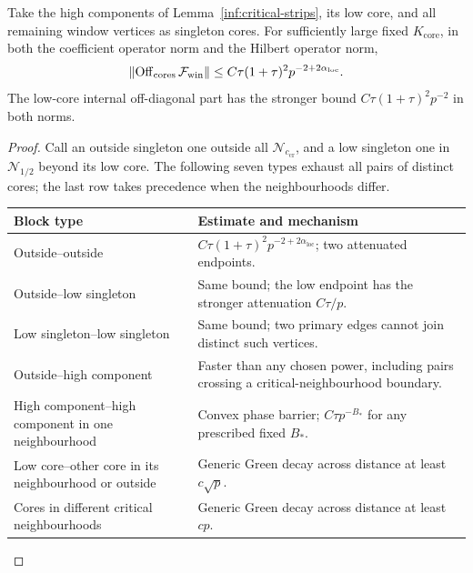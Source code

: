\begin{lemma}\label{inf:off-core-table}
Take the high components of Lemma~\ref{inf:critical-strips}, its
low core, and all remaining window vertices as singleton cores.
For sufficiently large fixed $K_{\mathrm{core}}$, in both the
coefficient operator norm and the Hilbert operator norm,
\begin{equation}\label{inf:global-off-core}
 \lVert \operatorname{Off}_{\mathrm{cores}}\mathcal F_{\mathrm{win}}\rVert
 \le C\tau(1+\tau)^2p^{-2+2\alpha_{\mathrm{loc}}}.
\end{equation}
The low-core internal off-diagonal part has the stronger bound
$C\tau(1+\tau)^2p^{-2}$ in both norms.
\end{lemma}
\begin{proof}
Call an outside singleton one outside all $\mathcal N_{c_{\mathrm{cr}}}$, and a low
singleton one in $\mathcal N_{1/2}$ beyond its low core.
The following seven types exhaust all pairs of distinct cores;
the last row takes precedence when the neighbourhoods differ.
\begin{center}\small\normalfont
\begin{tabular}{@{}>{\raggedright\arraybackslash}p{}>{\raggedright\arraybackslash}p{}@{}}
\toprule Block type & Estimate and mechanism\\\midrule
Outside--outside & $C\tau(1+\tau)^2p^{-2+2\alpha_{\mathrm{loc}}}$;
two attenuated endpoints.\\
Outside--low singleton & Same bound; the low endpoint has the
stronger attenuation $C\tau/p$.\\
Low singleton--low singleton & Same bound; two primary edges
cannot join distinct such vertices.\\
Outside--high component & Faster than any chosen power,
including pairs crossing a critical-neighbourhood boundary.\\
High component--high component in one neighbourhood &
Convex phase barrier; $C\tau p^{-B_*}$ for any prescribed fixed $B_*$.\\
Low core--other core in its neighbourhood or outside &
Generic Green decay across distance at least $c\sqrt p$.\\
Cores in different critical neighbourhoods &
Generic Green decay across distance at least $cp$.\\
\bottomrule
\end{tabular}
\end{center}


\end{proof}
